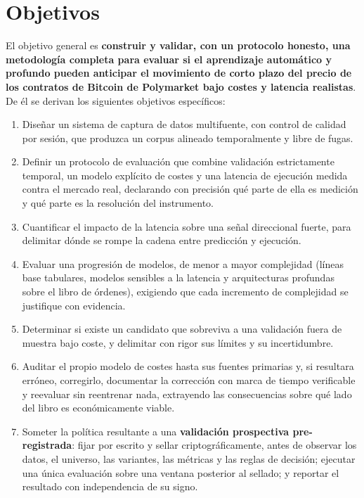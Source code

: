 \section{Objetivos}

El objetivo general es \textbf{construir y validar, con un protocolo honesto, una
metodología completa para evaluar si el aprendizaje automático y profundo pueden anticipar
el movimiento de corto plazo del precio de los contratos de Bitcoin de Polymarket bajo
costes y latencia realistas}. De él se derivan los siguientes objetivos específicos:

\begin{enumerate}[noitemsep]
  \item Diseñar un sistema de captura de datos multifuente, con control de calidad por
  sesión, que produzca un corpus alineado temporalmente y libre de fugas.
  \item Definir un protocolo de evaluación que combine validación estrictamente temporal,
  un modelo explícito de costes y una latencia de ejecución medida contra el mercado real,
  declarando con precisión qué parte de ella es medición y qué parte es la resolución del
  instrumento.
  \item Cuantificar el impacto de la latencia sobre una señal direccional fuerte, para
  delimitar dónde se rompe la cadena entre predicción y ejecución.
  \item Evaluar una progresión de modelos, de menor a mayor complejidad (líneas base
  tabulares, modelos sensibles a la latencia y arquitecturas profundas sobre el libro de
  órdenes), exigiendo que cada incremento de complejidad se justifique con evidencia.
  \item Determinar si existe un candidato que sobreviva a una validación fuera de muestra
  bajo coste, y delimitar con rigor sus límites y su incertidumbre.
  \item Auditar el propio modelo de costes hasta sus fuentes primarias y, si resultara
  erróneo, corregirlo, documentar la corrección con marca de tiempo verificable y
  reevaluar sin reentrenar nada, extrayendo las consecuencias sobre qué lado del libro es
  económicamente viable.
  \item Someter la política resultante a una \textbf{validación prospectiva
  pre-registrada}: fijar por escrito y sellar criptográficamente, antes de observar los
  datos, el universo, las variantes, las métricas y las reglas de decisión; ejecutar una
  única evaluación sobre una ventana posterior al sellado; y reportar el resultado con
  independencia de su signo.
\end{enumerate}

